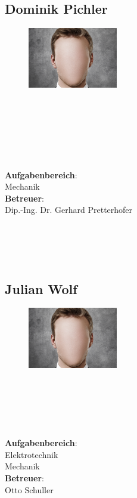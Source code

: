 \subsection*{Dominik Pichler}
\begin{figure}
\begin{center}
  \includegraphics[width=0.35\textwidth]{Bilder/face.jpg}
\end{center}
\end{figure}
\mbox{}\\
\mbox{}\\
\mbox{}\\
\mbox{}\\
\mbox{}\\
\mbox{}\\
\textbf{Aufgabenbereich}:\\
Mechanik\\
\textbf{Betreuer}:\\
Dip.-Ing. Dr. Gerhard Pretterhofer
\mbox{}\\
\mbox{}\\
\mbox{}\\
\mbox{}\\
\mbox{}\\

\subsection*{Julian Wolf}
\begin{figure}
\begin{center}
  \includegraphics[width=0.35\textwidth]{Bilder/face.jpg}
\end{center}
\end{figure}
\mbox{}\\
\mbox{}\\
\mbox{}\\
\mbox{}\\
\mbox{}\\
\textbf{Aufgabenbereich}:\\
Elektrotechnik\\
Mechanik\\
\textbf{Betreuer}:\\
Otto Schuller
